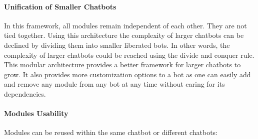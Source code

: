 \paragraph*{Unification of Smaller Chatbots}
In this framework, all modules remain independent of each other. They are not tied together. Using this architecture the complexity of larger chatbots can be declined by dividing them into smaller liberated bots. In other words, the complexity of larger chatbots could be reached using the divide and conquer rule. This modular architecture provides a better framework for larger chatbots to grow. It also provides more customization options to a bot as one can easily add and remove any module from any bot at any time without caring for its dependencies.

\paragraph*{Modules Usability}
Modules can be reused within the same chatbot or different chatbots:

